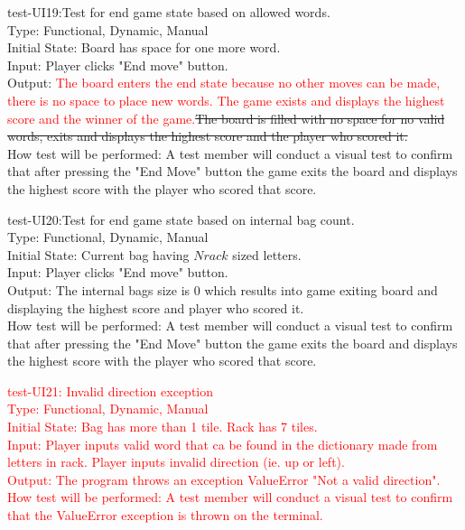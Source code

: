 \documentclass[12pt, titlepage]{article}
\begin{document}
\begin{enumerate}
    \item{test-UI19:Test for end game state based on allowed words.\\} %
    Type: Functional, Dynamic, Manual\\
    Initial State: Board has space for one more word.\\
    Input: Player clicks "End move" button. \\
    Output: \textcolor{red}{The board enters the end state because no other moves can be made, there is no space to place new words. The game exists and displays the highest score and the winner of the game.}\sout{The board is filled with no space for no valid words, exits and displays the highest score and the player who scored it.} \\
    How test will be performed: A test member will conduct a visual test to confirm that after pressing the "End Move" button the game exits the board and displays the highest score with the player who scored that score.\\
    
    \item{test-UI20:Test for end game state based on internal bag count.\\} %
    Type: Functional, Dynamic, Manual\\
    Initial State: Current bag having $N rack$ sized letters.\\
    Input: Player clicks "End move" button. \\
    Output: The internal bags size is 0 which results into game exiting board and displaying the highest score and player who scored it. \\
    How test will be performed: A test member will conduct a visual test to confirm that after pressing the "End Move" button the game exits the board and displays the highest score with the player who scored that score.\\
    
    \textcolor{red}{\item test-UI21: Invalid direction exception\\
    Type: Functional, Dynamic, Manual\\
    Initial State: Bag has more than 1 tile. Rack has 7 tiles. \\
    Input: Player inputs valid word that ca be found in the dictionary made from letters in rack. Player inputs invalid direction (ie. up or left).\\
    Output: The program throws an exception ValueError "Not a valid direction".\\
    How test will be performed: A test member will conduct a visual test to confirm that the ValueError exception is thrown on the terminal.}
    

\end{enumerate}
\end{document}
